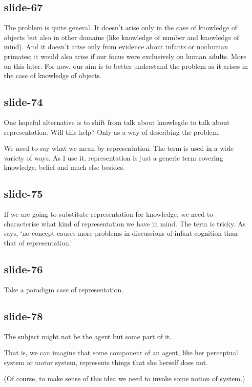 \documentclass[12pt,\papersize]{extarticle}
\begin{document}
\subsection{slide-67}
The problem is quite general.
It doesn't arise only in the case of knowledge of objects but also in other domains
(like knowledge of number and knowledge of mind).
And it doesn't arise only from evidence about infants or nonhuman primates; it would also
arise if our focus were exclusively on human adults.
More on this later.
For now, our aim is to better understand the problem as it arises in the case of knowledge of objects.

\subsection{slide-74}
One hopeful alternative is to shift from talk about knowlegde to talk about representation.
Will this help?
Only as a way of describing the problem.

We need to say what we mean by representation.
The term is used in a wide variety of ways.
As I use it, representation is just a generic term covering knowledge,
belief and much else besides.

\subsection{slide-75}
If we are going to substitute representation for knowledge,
we need to characterise what kind of representation we have in mind.
The term is tricky.
As \citet{Haith:1998aq} says, ‘no concept causes more problems in discussions of infant cognition than that of representation.’

\subsection{slide-76}
Take a paradigm case of representation.

\subsection{slide-78}
The subject might not be the agent but some part of it.

That is, we can imagine that some component of an agent, like her
perceptual system or motor system, represents things that she herself does
not.

(Of course, to make sense of this idea we need to invoke some notion of system.)
\end{document}
